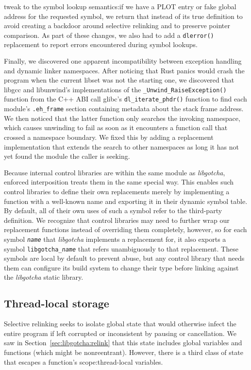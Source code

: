 tweak to the symbol lookup semantics:\@ if we have a PLOT entry or fake global
address for the requested symbol, we return that instead of its true definition to
avoid creating a backdoor around selective relinking and to preserve pointer
comparison.  As part of these changes, we also had to add a
\texttt{dlerror()} replacement to report errors encountered during symbol lookups.

Finally, we discovered one apparent incompatibility between exception handling and
dynamic linker namespaces.  After noticing that Rust panics would crash the program
when the current libset was not the starting one, we discovered that libgcc and
libunwind's implementations of the \texttt{\_Unwind\_RaiseException()} function from
the C++ ABI call glibc's \texttt{dl\_iterate\_phdr()} function to find each module's
\texttt{.eh\_frame} section containing metadata about the stack frame address.  We
then noticed that the latter function only searches the invoking namespace, which
causes unwinding to fail as soon as it encounters a function call that crossed a
namespace boundary.  We fixed this by adding a replacement implementation that
extends the search to other namespaces as long it has not yet found the module the
caller is seeking.

Because internal control libraries are within the same module as \textit{libgotcha},
enforced interposition treats them in the same special way.  This enables such
control libraries to define their own replacements merely by implementing a function
with a well-known name and exporting it in their dynamic symbol table.  By default,
all of their own uses of such a symbol refer to the third-party definition.  We
recognize that control libraries may need to further wrap our replacement functions
instead of overriding them completely, however, so for each symbol
\texttt{\textit{name}} that \textit{libgotcha} implements a replacement for, it also
exports a symbol \texttt{libgotcha\_\textit{name}} that refers unambiguously to that
replacement.  These symbols are local by default to prevent abuse, but any control
library that needs them can configure its build system to change their type before
linking against the \textit{libgotcha} static library.


\subsection{Thread-local storage}
\label{sec:libgotcha:tls}

Selective relinking seeks to isolate global state that would otherwise infect the
entire program if left corrupted or inconsistent by pausing or cancellation.  We saw
in Section~\ref{sec:libgotcha:relink} that this state includes global variables and
functions (which might be nonreentrant).  However, there is a third class of state
that escapes a function's scope:\@ thread-local variables.

